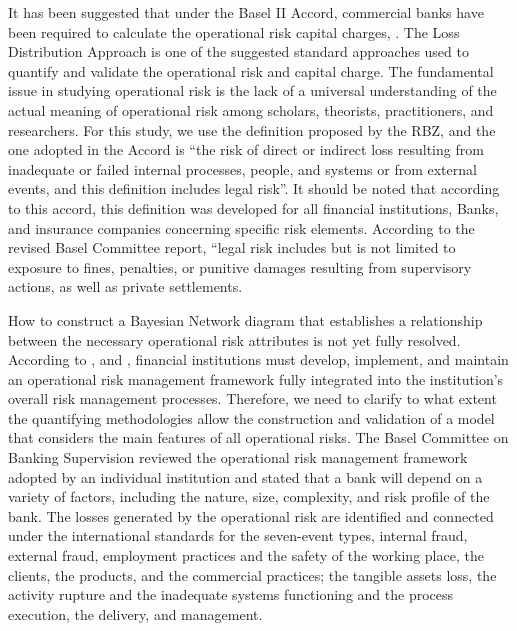 It has been suggested that under the Basel II Accord, commercial banks have been required to calculate the operational risk capital charges, \parencite{shevchenko2013loss}. The Loss Distribution Approach is one of the suggested standard approaches used to quantify and validate the operational risk and capital charge. The fundamental issue in studying operational risk is the lack of a universal understanding of the actual meaning of operational risk among scholars, theorists, practitioners, and researchers. For this study, we use the definition proposed by the RBZ, and the one adopted in the Accord is “the risk of direct or indirect loss resulting from inadequate or failed internal processes, people, and systems or from external events, and this definition includes legal risk”.  It should be noted that according to this accord, this definition was developed for all financial institutions, Banks, and insurance companies concerning specific risk elements. According to the revised Basel Committee report, “legal risk includes but is not limited to exposure to fines, penalties, or punitive damages resulting from supervisory actions, as well as private settlements. 

How to construct a Bayesian Network diagram that establishes a relationship between the necessary operational risk attributes is not yet fully resolved. According to \textcite{basel2021principles}, and \textcite{difrancesco2023bayesian}, financial institutions must develop, implement, and maintain an operational risk management framework fully integrated into the institution’s overall risk management processes. Therefore, we need to clarify to what extent the quantifying methodologies allow the construction and validation of a model that considers the main features of all operational risks. The Basel Committee on Banking Supervision reviewed the operational risk management framework adopted by an individual institution and stated that a bank will depend on a variety of factors, including the nature, size, complexity, and risk profile of the bank. The losses generated by the operational risk are identified and connected under the international standards for the seven-event types, internal fraud, external fraud, employment practices and the safety of the working place, the clients, the products, and the commercial practices; the tangible assets loss, the activity rupture and the inadequate systems functioning and the process execution, the delivery, and management. 


